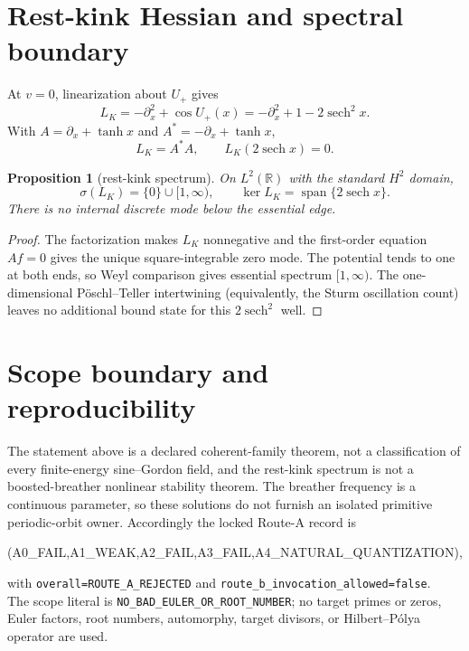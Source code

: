 \documentclass[10pt]{article}
\newtheorem{proposition}[theorem]{Proposition}
\newcommand{\R}{\mathbb R}
\newcommand{\sech}{\operatorname{sech}}
\begin{document}
\section{Rest-kink Hessian and spectral boundary}
At $v=0$, linearization about $U_+$ gives
\begin{equation}
 L_K=-\partial_x^2+\cos U_+(x)
     =-\partial_x^2+1-2\sech^2x .
 \label{eq:hessian}
\end{equation}
With $A=\partial_x+\tanh x$ and
$A^*=-\partial_x+\tanh x$,
\begin{equation}
 L_K=A^*A,\qquad L_K(2\sech x)=0 .
 \label{eq:factor}
\end{equation}
\begin{proposition}[rest-kink spectrum]\label{prop:spectrum}
On $L^2(\R)$ with the standard $H^2$ domain,
\[
 \sigma(L_K)=\{0\}\cup[1,\infty),\qquad
 \ker L_K=\operatorname{span}\{2\sech x\}.
\]
There is no internal discrete mode below the essential edge.
\end{proposition}
\begin{proof}
The factorization makes $L_K$ nonnegative and the first-order equation
$Af=0$ gives the unique square-integrable zero mode.  The potential tends to
one at both ends, so Weyl comparison gives essential spectrum $[1,\infty)$.
The one-dimensional Pöschl--Teller intertwining (equivalently, the Sturm
oscillation count) leaves no additional bound state for this $2\sech^2$
well.
\end{proof}

\section{Scope boundary and reproducibility}
The statement above is a declared coherent-family theorem, not a classification
of every finite-energy sine--Gordon field, and the rest-kink spectrum is not a
boosted-breather nonlinear stability theorem.  The breather frequency is a
continuous parameter, so these solutions do not furnish an isolated primitive
periodic-orbit owner.  Accordingly the locked Route-A record is
\begin{center}\ttfamily
(A0\_FAIL,A1\_WEAK,A2\_FAIL,A3\_FAIL,A4\_NATURAL\_QUANTIZATION),
\end{center}
with \texttt{overall=ROUTE\_A\_REJECTED} and
\texttt{route\_b\_invocation\_allowed=false}.\\
The scope literal is
\texttt{NO\_BAD\_EULER\_OR\_ROOT\_NUMBER}; no target primes or zeros, Euler
factors, root numbers, automorphy, target divisors, or Hilbert--Pólya operator
are used.
\end{document}
